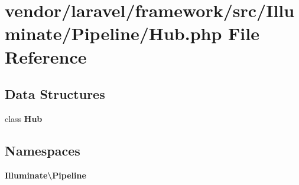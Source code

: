 \section{vendor/laravel/framework/src/\+Illuminate/\+Pipeline/\+Hub.php File Reference}
\label{_pipeline_2_hub_8php}
\subsection*{Data Structures}
\begin{DoxyCompactItemize}
\item 
class {\bf Hub}
\end{DoxyCompactItemize}
\subsection*{Namespaces}
\begin{DoxyCompactItemize}
\item 
 {\bf Illuminate\textbackslash{}\+Pipeline}
\end{DoxyCompactItemize}
